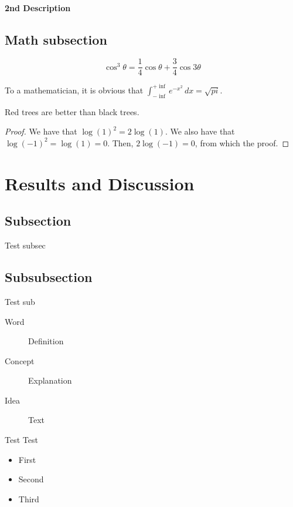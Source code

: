 \documentclass[10pt, 
a4paper, 
oneside, 
headinclude, footinclude, 
BCOR5mm]
{scrartcl}
\begin{document}
\paragraph{2nd Description}

\subsection{Math subsection}

\begin{equation}
    \cos^3 \theta = \frac{1}{4}\cos\theta + \frac{3}{4}\cos 3\theta
    \label{eq:refname2}
\end{equation}

\begin{definition}[Gauss]
    To a mathematician, it is obvious that
    $\int_{-\inf}^{+\inf} e^{-x^2}\, dx=\sqrt{pi}$.
\end{definition}

\begin{theorem}
    Red trees are better than black trees.
\end{theorem}

\begin{proof}
    We have that $\log(1)^2 = 2\log(1)$.
    We also have that $\log(-1)^2 = \log(1) = 0$.
    Then, $2\log(-1) = 0$, from which the proof.
\end{proof}

\section{Results and Discussion}

\subsection{Subsection}
Test subsec

\subsection{Subsubsection}
Test sub

\begin{description}
    \item[Word] Definition
    \item[Concept] Explanation
    \item[Idea] Text
\end{description}

Test Test

\begin{itemize}[noitemsep]
    \item First
    \item Second
    \item Third
\end{itemize}
\end{document}
